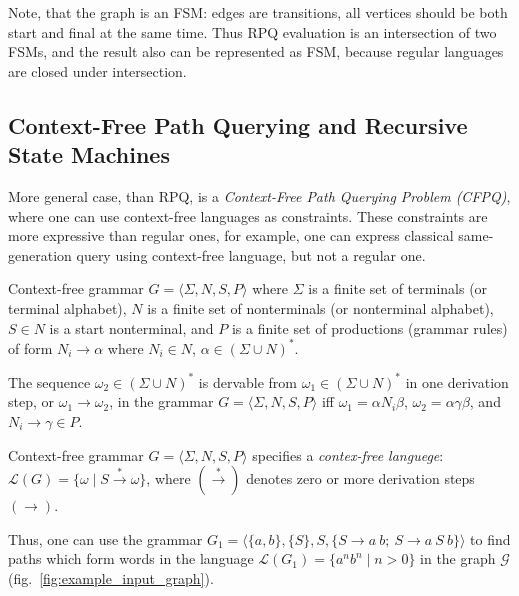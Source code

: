 Note, that the graph is an FSM: edges are transitions, all vertices should be both start and final at the same time.
Thus RPQ evaluation is an intersection of two FSMs, and the result also can be represented as FSM, because regular languages are closed under intersection.

\subsection{Context-Free Path Querying and Recursive State Machines}

More general case, than RPQ, is a \textit{Context-Free Path Querying Problem (CFPQ)}, where one can use context-free languages as constraints. These constraints are more expressive than regular ones, for example, one can express classical same-generation query using context-free language, but not a regular one.


\begin{definition} 
Context-free grammar $G = \langle\Sigma, N, S, P\rangle$ where $\Sigma$ is a finite set of terminals (or terminal alphabet), $N$ is a finite set of nonterminals (or nonterminal alphabet), $S \in N$ is a start nonterminal, and $P$ is a finite set of productions (grammar rules) of form $N_i \to \alpha$ where  $N_i \in N$, $\alpha \in (\Sigma \cup N)^*$.
\end{definition}

\begin{definition}
The sequence $\omega_2 \in (\Sigma \cup N)^*$ is dervable from $\omega_1 \in (\Sigma \cup N)^*$ in one derivation step, or $\omega_1 \to \omega_2$, in the grammar $G = \langle\Sigma, N, S, P\rangle$ iff $\omega_1=\alpha N_i \beta$, $\omega_2 = \alpha \gamma \beta$, and $N_i \to \gamma \in P$.
\end{definition}

\begin{definition}
Context-free grammar $G=\langle\Sigma, N, S, P\rangle$ specifies a \textit{contex-free languege}: $\mathcal{L}(G) = \{\omega \mid S \xrightarrow{*} \omega \}$, where $(\xrightarrow{*})$ denotes zero or more derivation steps $(\to)$.    
\end{definition}

Thus, one can use the grammar $G_1 = \langle \{a,b\}, \{S\}, S, \{S \to a \ b; \ S \to a \ S \ b\} \rangle$ to find paths which form words in the language $\mathcal{L}(G_1) = \{a^n b^n \mid n > 0\}$ in the graph $\mathcal{G}$ (fig.~\ref{fig:example_input_graph}).

